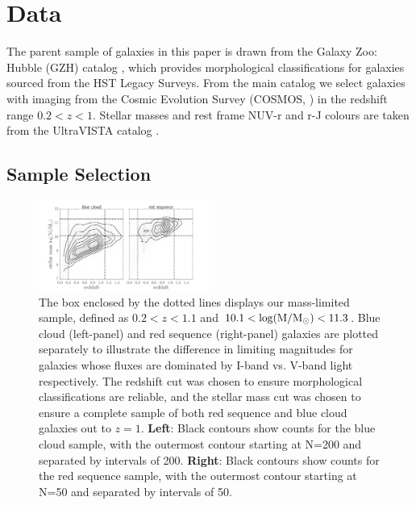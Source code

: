 \documentclass[useAMS,usenatbib]{mn2e}
\begin{document}
\section{Data}
\label{sec:Data}

The parent sample of galaxies in this paper is drawn from the Galaxy Zoo: Hubble (GZH) catalog \citep{Willett2016}, which provides morphological classifications for galaxies sourced from the HST Legacy Surveys. From the main catalog we select galaxies with imaging from the Cosmic Evolution Survey (COSMOS, \citet{Scoville2007}) in the redshift range $0.2<z<1$. Stellar masses and rest frame NUV-r and r-J colours are taken from the UltraVISTA catalog \citep{McCracken2012,Ilbert2013}.

\subsection{Sample Selection}
\label{sec:sampleselection}

\begin{figure}
\centering
\includegraphics[width=0.5\textwidth]{figures/mass_selection.pdf}
\caption{The box enclosed by the dotted lines displays our mass-limited sample, defined as $0.2<z<1.1$ and $10.1<\rm \log(M/M_{\odot})<11.3$. Blue cloud (left-panel) and red sequence (right-panel) galaxies are plotted separately to illustrate the difference in limiting magnitudes for galaxies whose fluxes are dominated by I-band vs. V-band light respectively. The redshift cut was chosen to ensure morphological classifications are reliable, and the stellar mass cut was chosen to ensure a complete sample of both red sequence and blue cloud galaxies out to $z=1$. \textbf{Left}: Black contours show counts for the blue cloud sample, with the outermost contour starting at N=200 and separated by intervals of 200. \textbf{Right}: Black contours show counts for the red sequence sample, with the outermost contour starting at N=50 and separated by intervals of 50. }
\label{masscut}
\end{figure}
\end{document}
